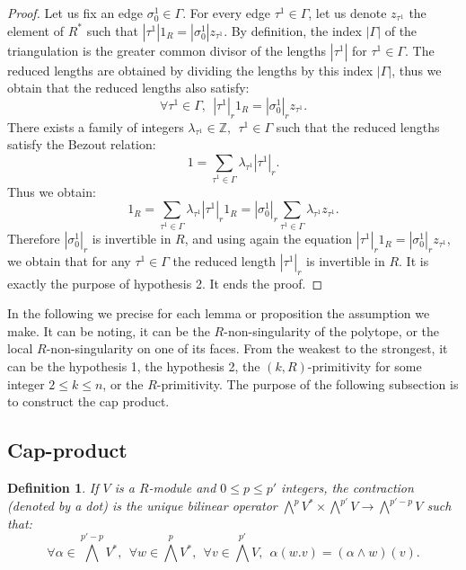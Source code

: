 \documentclass{article}
\newtheorem{definition}{Definition}
\begin{document}
\begin{proof}
    Let us fix an edge $\sigma^1_0\in\Gamma$. For every edge $\tau^1\in \Gamma$, let us denote $z_{\tau^1}$ the element of $R^*$ such that $|\tau^1|1_R=|\sigma^1_0|z_{\tau^1}$. By definition, the index $|\Gamma|$ of the triangulation is the greater common divisor of the lengths $|\tau^1|$ for $\tau^1 \in \Gamma$. The reduced lengths are obtained by dividing the lengths by this index $|\Gamma|$, thus we obtain that the reduced lengths also satisfy:
    \begin{equation*}
        \forall\tau^1 \in \Gamma,~~|\tau^1|_r1_R=|\sigma^1_0|_rz_{\tau^1}.
    \end{equation*}
    There exists a family of integers $\lambda_{\tau^1}\in\mathbb{Z}, ~~\tau^1\in\Gamma$ such that the reduced lengths satisfy the Bezout relation:
    \begin{equation*}
        1=\sum_{\tau^1\in\Gamma}\lambda_{\tau^1}|\tau^1|_r.
    \end{equation*}
    Thus we obtain:
    \begin{equation*}
        1_R=\sum_{\tau^1\in\Gamma}\lambda_{\tau^1}|\tau^1|_r1_R=|\sigma^1_0|_r\sum_{\tau^1\in\Gamma}\lambda_{\tau^1}z_{\tau^1}.
    \end{equation*}
    Therefore $|\sigma^1_0|_r$ is invertible in $R$, and using again the equation $|\tau^1|_r1_R=|\sigma^1_0|_rz_{\tau^1}$, we obtain that for any $\tau^1 \in \Gamma$ the reduced length $|\tau^1|_r$ is invertible in $R$. It is exactly the purpose of hypothesis 2. It ends the proof.
\end{proof}

In the following we precise for each lemma or proposition the assumption we make. It can be noting, it can be the $R$-non-singularity of the polytope, or the local $R$-non-singularity on one of its faces. From the weakest to the strongest, it can be the hypothesis 1, the hypothesis 2, the $(k,R)$-primitivity for some integer $2 \leq k \leq n$, or the $R$-primitivity. The purpose of the following subsection is to construct the cap product.

\subsection{Cap-product}

\begin{definition}
    If $V$ is a $R$-module and $0 \leq p \leq p'$ integers, the contraction (denoted by a dot) is the unique bilinear operator $\bigwedge^p V^* \times \bigwedge^{p'} V \rightarrow \bigwedge^{p'-p} V$ such that:
    \begin{equation*}
        \forall \alpha \in \bigwedge^{p'-p}V^*, ~~\forall w \in \bigwedge^p V^*,~~ \forall v \in \bigwedge^{p'}V, ~~\alpha(w.v)=(\alpha\wedge w)(v).
    \end{equation*}
    \label{defcontr}
\end{definition}
\end{document}
